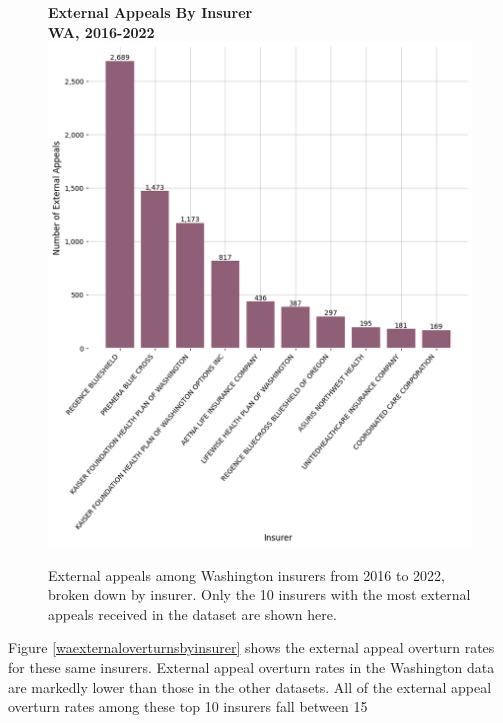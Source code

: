 \documentclass[12pt, a4paper,twoside,parskip=full]{report}
\theoremstyle{plain} %
\theoremstyle{definition} %
\theoremstyle{remark} %
\numberwithin{equation}{chapter}
\begin{document}
		
		\begin{figure}[h!]
			\centering
			\textbf{External Appeals By Insurer}\\
			\textbf{WA, 2016-2022}\\
			\includegraphics[width=.8\textwidth]{images/wa_external_appeals/external_appeals_by_insurer.png}
			\caption{External appeals among Washington insurers from 2016 to 2022, broken down by insurer. Only the 10 insurers with the most external appeals received in the dataset are shown here.}
			\label{waexternalbyinsurer}
		\end{figure}
		\clearpage
		
		Figure \ref{waexternaloverturnsbyinsurer} shows the external appeal overturn rates for these same insurers. External appeal overturn rates in the Washington data are markedly lower than those in the other datasets. All of the external appeal overturn rates among these top 10 insurers fall between 15%
		
\end{document}
